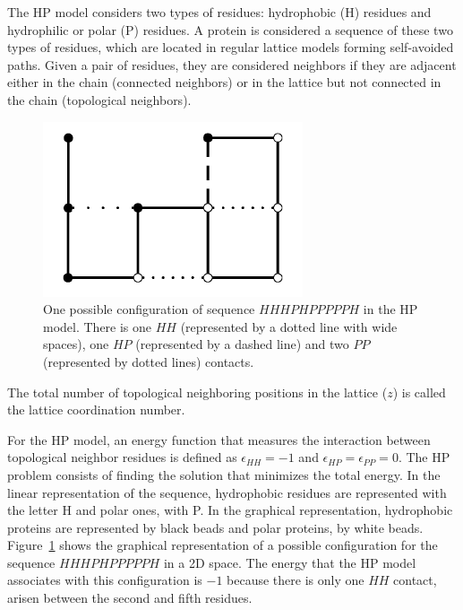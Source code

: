 The HP model considers two types of residues:  hydrophobic (H) residues  and hydrophilic or polar (P) residues. A protein is considered a sequence of these two types of residues, which are located in regular lattice models forming self-avoided paths. Given a pair of residues, they are considered neighbors if they are adjacent  either in the chain (connected neighbors) or  in the lattice but not connected in the chain (topological neighbors).

\begin{figure}[htb!] \label{fig:PROTEXAM}
	\centering
	\includegraphics[scale=0.7]{figures/protein_example.png}
	\caption{One possible configuration of  sequence $HHHPHPPPPPH$ in the HP model. There is one $HH$ (represented by a dotted line with wide spaces), one $HP$ (represented by a dashed line) and  two $PP$  (represented by dotted lines) contacts.}
\end{figure}


The total number of topological neighboring positions in the lattice ($z$) is called the lattice coordination number.


For the HP model, an energy function that  measures the interaction between topological  neighbor residues is defined  as  $\epsilon_{HH}=-1$ and $\epsilon_{HP}=\epsilon_{PP}=0$. The HP problem consists of finding the solution that minimizes the total energy. In the linear representation of the sequence, hydrophobic residues are represented with the letter H and polar ones, with P. In the graphical representation, hydrophobic proteins are represented  by black beads and polar proteins, by white beads. Figure~\ref{fig:PROTEXAM} shows the graphical representation of a possible configuration for  the sequence  $HHHPHPPPPPH$ in a 2D space. The energy that the HP model associates with this configuration is $-1$ because there is only one $HH$ contact, arisen between the second and fifth residues.


